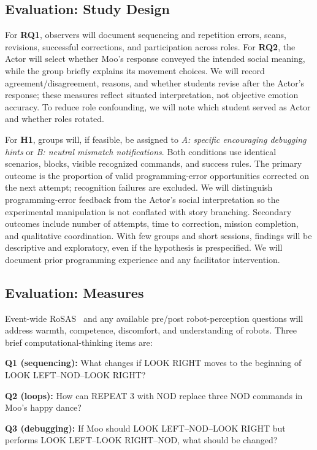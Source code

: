 \documentclass[conference,12pt,letterpaper]{IEEEtran}
\begin{document}
\subsection{Evaluation: Study Design}
For \textbf{RQ1}, observers will document sequencing and repetition errors, scans, revisions, successful corrections, and participation across roles. For \textbf{RQ2}, the Actor will select whether Moo's response conveyed the intended social meaning, while the group briefly explains its movement choices. We will record agreement/disagreement, reasons, and whether students revise after the Actor's response; these measures reflect situated interpretation, not objective emotion accuracy. To reduce role confounding, we will note which student served as Actor and whether roles rotated.

For \textbf{H1}, groups will, if feasible, be assigned to \emph{A: specific encouraging debugging hints} or \emph{B: neutral mismatch notifications}. Both conditions use identical scenarios, blocks, visible recognized commands, and success rules. The primary outcome is the proportion of valid programming-error opportunities corrected on the next attempt; recognition failures are excluded. We will distinguish programming-error feedback from the Actor's social interpretation so the experimental manipulation is not conflated with story branching. Secondary outcomes include number of attempts, time to correction, mission completion, and qualitative coordination. With few groups and short sessions, findings will be descriptive and exploratory, even if the hypothesis is prespecified. We will document prior programming experience and any facilitator intervention.

\subsection{Evaluation: Measures}
Event-wide RoSAS~\cite{carpinella2017} and any available pre/post robot-perception questions will address warmth, competence, discomfort, and understanding of robots. Three brief computational-thinking items are:

\textbf{Q1 (sequencing):} What changes if LOOK RIGHT moves to the beginning of LOOK LEFT--NOD--LOOK RIGHT?

\textbf{Q2 (loops):} How can REPEAT 3 with NOD replace three NOD commands in Moo's happy dance?

\textbf{Q3 (debugging):} If Moo should LOOK LEFT--NOD--LOOK RIGHT but performs LOOK LEFT--LOOK RIGHT--NOD, what should be changed?
\end{document}
